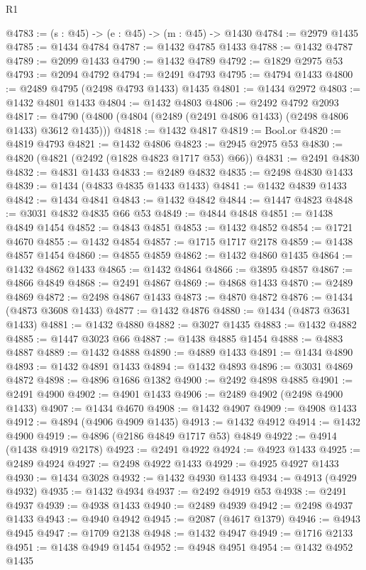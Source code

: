 \begin{lexlean}{R1}
\begin{coremodule}
@4783 := (s : @45) -> (e : @45) -> (m : @45) -> @1430
@4784 := @2979 @1435
@4785 := @1434 @4784
@4787 := @1432 @4785 @1433
@4788 := @1432 @4787
@4789 := @2099 @1433
@4790 := @1432 @4789
@4792 := @1829 @2975 @53
@4793 := @2094 @4792
@4794 := @2491 @4793
@4795 := @4794 @1433
@4800 := @2489 @4795 (@2498 @4793 @1433) @1435
@4801 := @1434 @2972
@4803 := @1432 @4801 @1433
@4804 := @1432 @4803
@4806 := @2492 @4792 @2093
@4817 := @4790 (@4800 (@4804 (@2489 (@2491 @4806 @1433) (@2498 @4806 @1433) @3612 @1435)))
@4818 := @1432 @4817
@4819 := Bool.or
@4820 := @4819 @4793
@4821 := @1432 @4806
@4823 := @2945 @2975 @53
@4830 := @4820 (@4821 (@2492 (@1828 @4823 @1717 @53) @66))
@4831 := @2491 @4830
@4832 := @4831 @1433
@4833 := @2489 @4832
@4835 := @2498 @4830 @1433
@4839 := @1434 (@4833 @4835 @1433 @1433)
@4841 := @1432 @4839 @1433
@4842 := @1434 @4841
@4843 := @1432 @4842
@4844 := @1447 @4823
@4848 := @3031 @4832 @4835 @66 @53
@4849 := @4844 @4848
@4851 := @1438 @4849 @1454
@4852 := @4843 @4851
@4853 := @1432 @4852
@4854 := @1721 @4670
@4855 := @1432 @4854
@4857 := @1715 @1717 @2178
@4859 := @1438 @4857 @1454
@4860 := @4855 @4859
@4862 := @1432 @4860 @1435
@4864 := @1432 @4862 @1433
@4865 := @1432 @4864
@4866 := @3895 @4857
@4867 := @4866 @4849
@4868 := @2491 @4867
@4869 := @4868 @1433
@4870 := @2489 @4869
@4872 := @2498 @4867 @1433
@4873 := @4870 @4872
@4876 := @1434 (@4873 @3608 @1433)
@4877 := @1432 @4876
@4880 := @1434 (@4873 @3631 @1433)
@4881 := @1432 @4880
@4882 := @3027 @1435
@4883 := @1432 @4882
@4885 := @1447 @3023 @66
@4887 := @1438 @4885 @1454
@4888 := @4883 @4887
@4889 := @1432 @4888
@4890 := @4889 @1433
@4891 := @1434 @4890
@4893 := @1432 @4891 @1433
@4894 := @1432 @4893
@4896 := @3031 @4869 @4872
@4898 := @4896 @1686 @1382
@4900 := @2492 @4898 @4885
@4901 := @2491 @4900
@4902 := @4901 @1433
@4906 := @2489 @4902 (@2498 @4900 @1433)
@4907 := @1434 @4670
@4908 := @1432 @4907
@4909 := @4908 @1433
@4912 := @4894 (@4906 @4909 @1435)
@4913 := @1432 @4912
@4914 := @1432 @4900
@4919 := @4896 (@2186 @4849 @1717 @53) @4849
@4922 := @4914 (@1438 @4919 @2178)
@4923 := @2491 @4922
@4924 := @4923 @1433
@4925 := @2489 @4924
@4927 := @2498 @4922 @1433
@4929 := @4925 @4927 @1433
@4930 := @1434 @3028
@4932 := @1432 @4930 @1433
@4934 := @4913 (@4929 @4932)
@4935 := @1432 @4934
@4937 := @2492 @4919 @53
@4938 := @2491 @4937
@4939 := @4938 @1433
@4940 := @2489 @4939
@4942 := @2498 @4937 @1433
@4943 := @4940 @4942
@4945 := @2087 (@4617 @1379)
@4946 := @4943 @4945
@4947 := @1709 @2138
@4948 := @1432 @4947
@4949 := @1716 @2133
@4951 := @1438 @4949 @1454
@4952 := @4948 @4951
@4954 := @1432 @4952 @1435

\end{coremodule}
\end{lexlean}
